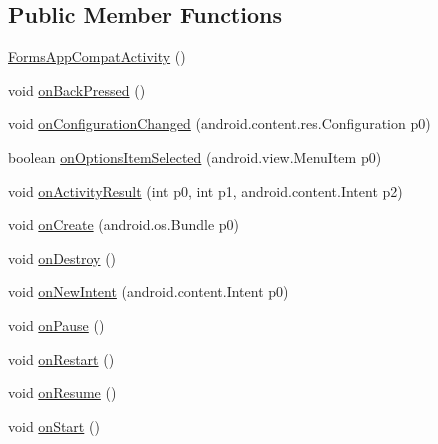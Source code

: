 \subsection*{Public Member Functions}
\begin{CompactItemize}
\item 
\hyperlink{classmd5b60ffeb829f638581ab2bb9b1a7f4f3f_1_1_forms_app_compat_activity_2d1a359f1aef2685ff63e85c9fe9bb9a}{FormsAppCompatActivity} ()
\item 
void \hyperlink{classmd5b60ffeb829f638581ab2bb9b1a7f4f3f_1_1_forms_app_compat_activity_13db69171e2e438c4fbbb5f59fa9b0fe}{onBackPressed} ()
\item 
void \hyperlink{classmd5b60ffeb829f638581ab2bb9b1a7f4f3f_1_1_forms_app_compat_activity_6efff316f1a0c8e543de9844c36ea857}{onConfigurationChanged} (android.content.res.Configuration p0)
\item 
boolean \hyperlink{classmd5b60ffeb829f638581ab2bb9b1a7f4f3f_1_1_forms_app_compat_activity_d71679491ce674b6fcefc81dcc73fbcd}{onOptionsItemSelected} (android.view.MenuItem p0)
\item 
void \hyperlink{classmd5b60ffeb829f638581ab2bb9b1a7f4f3f_1_1_forms_app_compat_activity_f329e41b3d57d0e505dd932a5d073788}{onActivityResult} (int p0, int p1, android.content.Intent p2)
\item 
void \hyperlink{classmd5b60ffeb829f638581ab2bb9b1a7f4f3f_1_1_forms_app_compat_activity_54bbc6de9184a753b146e365d02fdaa1}{onCreate} (android.os.Bundle p0)
\item 
void \hyperlink{classmd5b60ffeb829f638581ab2bb9b1a7f4f3f_1_1_forms_app_compat_activity_e9b5956435d3ea855e30420a6bde26f8}{onDestroy} ()
\item 
void \hyperlink{classmd5b60ffeb829f638581ab2bb9b1a7f4f3f_1_1_forms_app_compat_activity_3a5e7bf9d05c545fe127901e0908a237}{onNewIntent} (android.content.Intent p0)
\item 
void \hyperlink{classmd5b60ffeb829f638581ab2bb9b1a7f4f3f_1_1_forms_app_compat_activity_abcdd631e530d73c4684629394cb544f}{onPause} ()
\item 
void \hyperlink{classmd5b60ffeb829f638581ab2bb9b1a7f4f3f_1_1_forms_app_compat_activity_e6ef92a90ed2b3b497cde38bd2024062}{onRestart} ()
\item 
void \hyperlink{classmd5b60ffeb829f638581ab2bb9b1a7f4f3f_1_1_forms_app_compat_activity_5509346859968983835eee71f02ddcee}{onResume} ()
\item 
void \hyperlink{classmd5b60ffeb829f638581ab2bb9b1a7f4f3f_1_1_forms_app_compat_activity_919da8f4e7a50367d94fed82c31fd49a}{onStart} ()

\end{CompactItemize}
